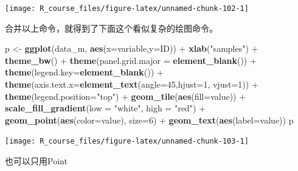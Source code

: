 \documentclass[]{article}
\newenvironment{Shaded}{\begin{snugshade}}{\end{snugshade}}
\newcommand{\KeywordTok}[1]{\textcolor[rgb]{0.13,0.29,0.53}{\textbf{{#1}}}}
\newcommand{\DataTypeTok}[1]{\textcolor[rgb]{0.13,0.29,0.53}{{#1}}}
\newcommand{\DecValTok}[1]{\textcolor[rgb]{0.00,0.00,0.81}{{#1}}}
\newcommand{\StringTok}[1]{\textcolor[rgb]{0.31,0.60,0.02}{{#1}}}
\newcommand{\NormalTok}[1]{{#1}}
\numberwithin{figure}{section}
\numberwithin{table}{section}
\theoremstyle{definition}
\theoremstyle{definition}
\theoremstyle{definition}
\theoremstyle{remark}
\begin{document}
\begin{center}\texttt{[image: R\_course\_files/figure-latex/unnamed-chunk-102-1]} \end{center}

合并以上命令，就得到了下面这个看似复杂的绘图命令。

\begin{Shaded}
\begin{Highlighting}[]
\NormalTok{p <-}\StringTok{ }\KeywordTok{ggplot}\NormalTok{(data_m, }\KeywordTok{aes}\NormalTok{(}\DataTypeTok{x=}\NormalTok{variable,}\DataTypeTok{y=}\NormalTok{ID)) +}\StringTok{ }\KeywordTok{xlab}\NormalTok{(}\StringTok{"samples"}\NormalTok{) +}\StringTok{ }\KeywordTok{theme_bw}\NormalTok{() +}\StringTok{ }
\StringTok{    }\KeywordTok{theme}\NormalTok{(}\DataTypeTok{panel.grid.major =} \KeywordTok{element_blank}\NormalTok{()) +}\StringTok{ }\KeywordTok{theme}\NormalTok{(}\DataTypeTok{legend.key=}\KeywordTok{element_blank}\NormalTok{()) +}\StringTok{ }
\StringTok{    }\KeywordTok{theme}\NormalTok{(}\DataTypeTok{axis.text.x=}\KeywordTok{element_text}\NormalTok{(}\DataTypeTok{angle=}\DecValTok{45}\NormalTok{,}\DataTypeTok{hjust=}\DecValTok{1}\NormalTok{, }\DataTypeTok{vjust=}\DecValTok{1}\NormalTok{)) +}\StringTok{ }
\StringTok{    }\KeywordTok{theme}\NormalTok{(}\DataTypeTok{legend.position=}\StringTok{"top"}\NormalTok{) +}\StringTok{  }\KeywordTok{geom_tile}\NormalTok{(}\KeywordTok{aes}\NormalTok{(}\DataTypeTok{fill=}\NormalTok{value)) +}\StringTok{ }
\StringTok{    }\KeywordTok{scale_fill_gradient}\NormalTok{(}\DataTypeTok{low =} \StringTok{"white"}\NormalTok{, }\DataTypeTok{high =} \StringTok{"red"}\NormalTok{) +}
\StringTok{  }\KeywordTok{geom_point}\NormalTok{(}\KeywordTok{aes}\NormalTok{(}\DataTypeTok{color=}\NormalTok{value), }\DataTypeTok{size=}\DecValTok{6}\NormalTok{) +}
\StringTok{  }\KeywordTok{geom_text}\NormalTok{(}\KeywordTok{aes}\NormalTok{(}\DataTypeTok{label=}\NormalTok{value))}
\NormalTok{p}
\end{Highlighting}
\end{Shaded}

\begin{center}\texttt{[image: R\_course\_files/figure-latex/unnamed-chunk-103-1]} \end{center}

也可以只用Point
\end{document}
